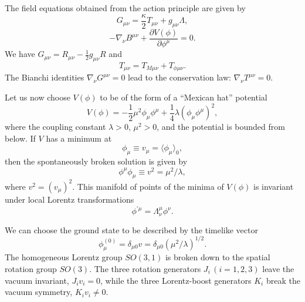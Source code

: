 \documentclass[a4paper,12pt]{article}
\begin{document}
The field equations obtained from the action principle are given
by
\begin{equation}
G_{\mu\nu}=\frac{\kappa}{2}T_{\mu\nu}+g_{\mu\nu}\Lambda,
\end{equation}
\begin{equation}
\label{Bequation}
-\nabla_\nu B^{\mu\nu}+\frac{\partial V(\phi)}{\partial\phi^\mu}=0.
\end{equation}
We have $G_{\mu\nu}=R_{\mu\nu}-\frac{1}{2}g_{\mu\nu}R$
and
\begin{equation}
T_{\mu\nu}=T_{M\mu\nu}+T_{\phi\mu\nu}.
\end{equation}
The Bianchi identities $\nabla_\nu G^{\mu\nu}=0$ lead to the
conservation law: $\nabla_\nu T^{\mu\nu}=0$.

Let us now choose $V(\phi)$ to be of the form of a ``Mexican hat''
potential
\begin{equation}
\label{phipotential}
V(\phi)=-\frac{1}{2}\mu^2\phi_\mu\phi^\mu+\frac{1}{4}\lambda(\phi_\mu\phi^\mu)^2,
\end{equation}
where the coupling constant $\lambda > 0$, $\mu^2 >0$, and the
potential is bounded from below. If $V$ has a minimum at
\begin{equation}
\phi_\mu\equiv v_\mu=\langle\phi_\mu\rangle_0,
\end{equation}
then the spontaneously broken solution is
given by
\begin{equation}
\phi^\mu\phi_\mu\equiv v^2=\mu^2/\lambda,
\end{equation}
where $v^2=(v_\mu)^2$.  This manifold of points of the minima of $V(\phi)$ is
invariant under local Lorentz transformations
\begin{equation}
\phi^{'\mu}=\Lambda^\mu_\nu\phi^\nu.
\end{equation}

We can choose the ground state to be described by the timelike
vector
\begin{equation}
\label{vev}
\phi_\mu^{(0)}=\delta_{\mu0}v=\delta_{\mu0}(\mu^2/\lambda)^{1/2}.
\end{equation}
The homogeneous Lorentz group $SO(3,1)$ is broken down to the
spatial rotation group $SO(3)$. The three rotation generators $J_i\,(i=1,2,3)$ leave
the vacuum invariant, $J_iv_i=0$, while the three Lorentz-boost generators $K_i$
break the vacuum symmetry, $K_iv_i\not= 0$.
\end{document}
